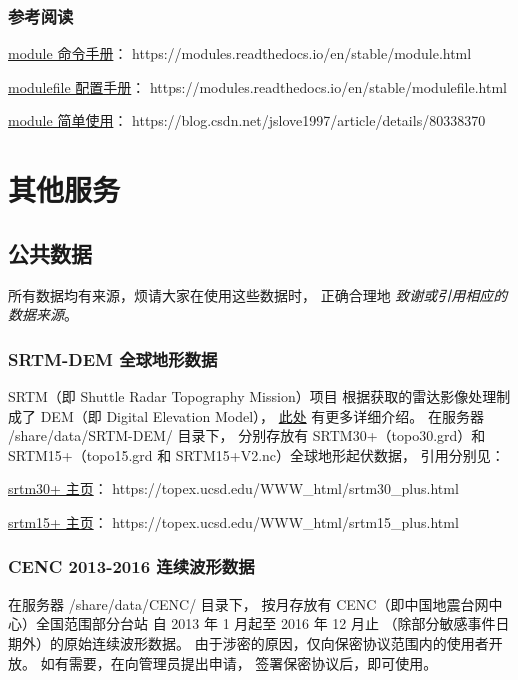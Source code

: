 \documentclass[UTF8]{ctexart}
\newcommand{\myem}[1]{{\color{red}\em #1}}
\begin{document}
\subsubsection{参考阅读}
\href{https://modules.readthedocs.io/en/stable/module.html}{module 命令手册}：
https://modules.readthedocs.io/en/stable/module.html

\href{https://modules.readthedocs.io/en/stable/modulefile.html}{modulefile 配置手册}：
https://modules.readthedocs.io/en/stable/modulefile.html

\href{https://blog.csdn.net/jslove1997/article/details/80338370}{module 简单使用}：
https://blog.csdn.net/jslove1997/article/details/80338370

\section{其他服务}
\subsection{公共数据}
所有数据均有来源，烦请大家在使用这些数据时，
正确合理地 \myem{致谢或引用相应的数据来源}。

\subsubsection{SRTM-DEM 全球地形数据}
SRTM（即 Shuttle Radar Topography Mission）项目
根据获取的雷达影像处理制成了 DEM（即 Digital Elevation Model），
\href{https://blog.seisman.info/srtm/}{此处} 有更多详细介绍。
在服务器 /share/data/SRTM-DEM/ 目录下，
分别存放有 SRTM30+（topo30.grd）和
SRTM15+（topo15.grd 和 SRTM15+V2.nc）全球地形起伏数据，
引用分别见：

\href{https://topex.ucsd.edu/WWW_html/srtm30_plus.html}{srtm30+ 主页}：
https://topex.ucsd.edu/WWW\_html/srtm30\_plus.html

\href{https://topex.ucsd.edu/WWW_html/srtm15_plus.html}{srtm15+ 主页}：
https://topex.ucsd.edu/WWW\_html/srtm15\_plus.html

\subsubsection{CENC 2013-2016 连续波形数据}
在服务器 /share/data/CENC/ 目录下，
按月存放有 CENC（即中国地震台网中心）全国范围部分台站
自 2013 年 1 月起至 2016 年 12 月止
（除部分敏感事件日期外）的原始连续波形数据。
由于涉密的原因，仅向保密协议范围内的使用者开放。
如有需要，在向管理员提出申请，
签署保密协议后，即可使用。
\end{document}
